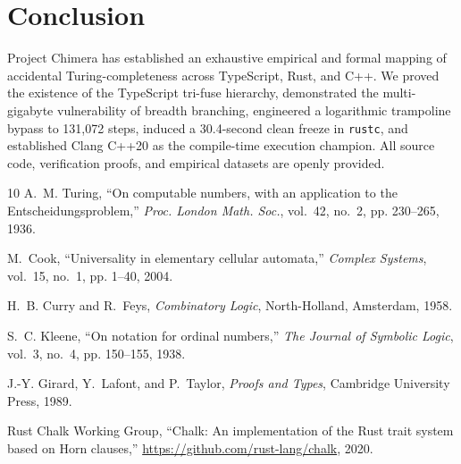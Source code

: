 \documentclass[10pt,journal,compsoc]{IEEEtran}
\begin{document}
\section{Conclusion}
Project Chimera has established an exhaustive empirical and formal mapping of accidental Turing-completeness across TypeScript, Rust, and C++. We proved the existence of the TypeScript tri-fuse hierarchy, demonstrated the multi-gigabyte vulnerability of breadth branching, engineered a logarithmic trampoline bypass to 131,072 steps, induced a 30.4-second clean freeze in \texttt{rustc}, and established Clang C++20 as the compile-time execution champion. All source code, verification proofs, and empirical datasets are openly provided.


\begin{thebibliography}{10}
A.~M. Turing, ``On computable numbers, with an application to the {Entscheidungsproblem},'' \emph{Proc. London Math. Soc.}, vol.~42, no.~2, pp. 230--265, 1936.

M.~Cook, ``Universality in elementary cellular automata,'' \emph{Complex Systems}, vol.~15, no.~1, pp. 1--40, 2004.

H.~B. Curry and R.~Feys, \emph{Combinatory Logic}, North-Holland, Amsterdam, 1958.

S.~C. Kleene, ``On notation for ordinal numbers,'' \emph{The Journal of Symbolic Logic}, vol.~3, no.~4, pp. 150--155, 1938.

J.-Y. Girard, Y.~Lafont, and P.~Taylor, \emph{Proofs and Types}, Cambridge University Press, 1989.

Rust Chalk Working Group, ``Chalk: An implementation of the Rust trait system based on Horn clauses,'' \url{https://github.com/rust-lang/chalk}, 2020.
\end{thebibliography}
\end{document}
